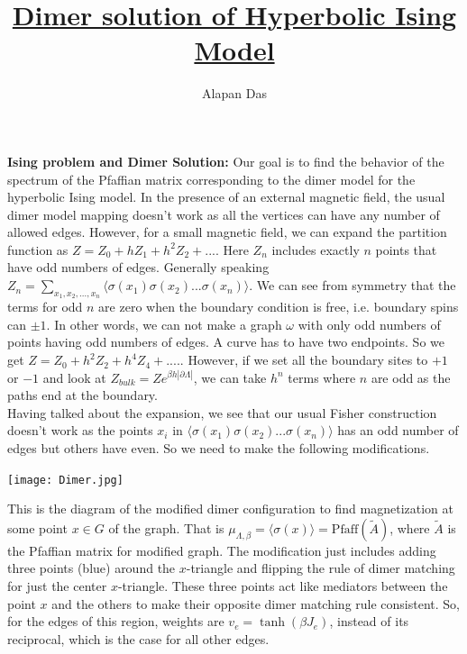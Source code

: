 \documentclass{article}
\title{\underline {\textbf{Dimer solution of Hyperbolic Ising Model}}}
\author{Alapan Das}
\date{}%
\begin{document}
	\maketitle 
	
     \textbf{Ising problem and Dimer Solution:} Our goal is to find the behavior of the spectrum of the Pfaffian matrix corresponding to the dimer model for the hyperbolic Ising model. In the presence of an external magnetic field, the usual dimer model mapping doesn't work as all the vertices can have any number of allowed edges. However, for a small magnetic field, we can expand the partition function as $Z=Z_0+hZ_1+h^2Z_2+...$. Here $Z_n$ includes exactly $n$ points that have odd numbers of edges. Generally speaking $Z_n=\sum_{x_1,x_2,...,x_n} \langle{\sigma(x_1)\sigma(x_2)...\sigma(x_n)}\rangle$. We can see from symmetry that the terms for odd $n$ are zero when the boundary condition is free, i.e. boundary spins can $\pm1$. In other words, we can not make a graph $\omega$ with only odd numbers of points having odd numbers of edges. A curve has to have two endpoints. So we get $Z=Z_0+h^2Z_2+h^4Z_4+....$. However, if we set all the boundary sites to $+1$ or $-1$ and look at $Z_{bulk}=Ze^{\beta h|\partial \Lambda|}$, we can take  $h^n$ terms where $n$ are odd as the paths end at the boundary. \\
     
     Having talked about the expansion, we see that our usual Fisher construction doesn't work as the points $x_i$ in $\langle{\sigma(x_1)\sigma(x_2)...\sigma(x_n)}\rangle$ has an odd number of edges but others have even. So we need to make the following modifications.\\
     
     
     \begin{center}
     	\texttt{[image: Dimer.jpg]}
     \end{center}
     
     This is the diagram of the modified dimer configuration to find magnetization at some point $x\in G$ of the graph. That is $\mu_{\Lambda, \beta}=\langle {\sigma(x)} \rangle =\text{Pfaff}(\tilde{A})$, where $\tilde{A}$ is the Pfaffian matrix for modified graph. The modification just includes adding three points (blue) around the $x$-triangle and flipping the rule of dimer matching for just the center $x$-triangle. These three points act like mediators between the point $x$ and the others to make their opposite dimer matching rule consistent. So, for the edges of this region, weights are $v_{e}=\tanh(\beta J_e)$, instead of its reciprocal, which is the case for all other edges. \\
     
\end{document}

